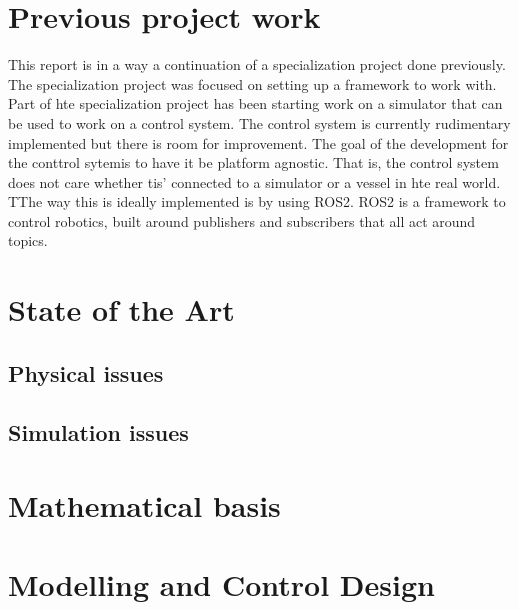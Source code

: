 \documentclass[class=article, crop=false, draft=true]{standalone}
\begin{document}
\section{Previous project work}
This report is in a way a continuation of a specialization project\cite{specialization} done previously. The specialization project was focused on setting up a framework to work with. Part of hte specialization project has been starting work on a simulator that can be used to work on a control system. The control system is currently rudimentary implemented but there is room for improvement. The goal of the development for the conttrol sytemis to have it be platform agnostic. That is, the control system does not care whether tis' connected to a simulator or a vessel in hte real world. TThe way this is ideally implemented is by using ROS2. ROS2 is a framework to control robotics, built around publishers and subscribers that all act around topics.



\section{State of the Art}
\subsection{Physical issues}
\subsection{Simulation issues}

\section{Mathematical basis}


\section{Modelling and Control Design}
\end{document}
